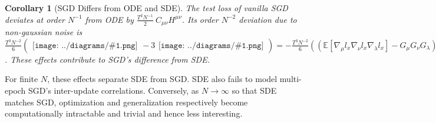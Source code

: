 \documentclass{article}
\theoremstyle{plain}
\newtheorem{cor}{Corollary}
\theoremstyle{definition}
\newcommand{\expct}[1]{\mathbb{E}\left[#1\right]}
\newcommand{\wrap}[1]{\left(#1\right)}
\newcommand{\sdia}[1]{\begin{gathered}\texttt{[image: ../diagrams/\#1.png]}\end{gathered}}
\begin{document}
        \begin{cor}[SGD Differs from ODE and SDE] \label{cor:vsode}
            The test loss of vanilla SGD deviates at order $N^{-1}$ from
            ODE by
            $
                \frac{T^2 N^{-1}}{2} ~ C_{\mu\nu} H^{\mu\nu}
            $.
            Its order $N^{-2}$ deviation due to non-gaussian noise is
            $
                \frac{T^3 N^{-2}}{6} \wrap{
                    \sdia{c(012-3)(03-13-23)}
                    -
                    3 \sdia{c(01-2-3)(03-13-23)}
                }
                =
                -
                \frac{T^3 N^{-2}}{6}  
                \wrap{
                    \wrap{
                        \expct{\nabla_\mu l_x \nabla_\nu l_x \nabla_\lambda l_x}-
                        G_\mu G_\nu G_\lambda
                    }
                    J^{\mu\nu\lambda}
                    - 
                    3
                    C_{\mu \nu} G_\lambda J^{\mu\nu\lambda}
                }
            $.
            These effects contribute to SGD's difference from SDE.
        \end{cor}
        For finite $N$, these effects separate SDE from SGD.  SDE also fails to
        model multi-epoch SGD's inter-update correlations.  Conversely, as
        $N\to\infty$ so that SDE matches SGD, optimization and generalization
        respectively become computationally intractable and trivial and hence
        less interesting.
    
\end{document}
